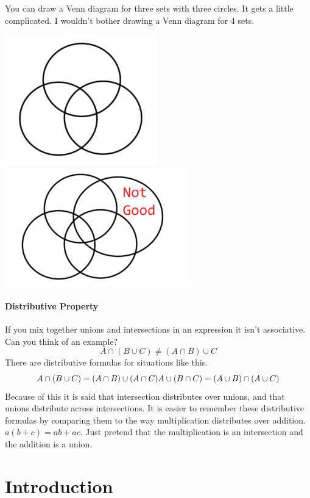 \documentclass[]{book}
\begin{document}
You can draw a Venn diagram for three sets with three circles. It gets a
little complicated. I wouldn't bother drawing a Venn diagram for 4 sets.

\includegraphics{Pictures/01-Sets/Venn3.PNG}
\includegraphics{Pictures/01-Sets/Venn4.PNG}

\subsubsection{Distributive Property}\label{distributive-property}

If you mix together unions and intersections in an expression it isn't
associative. Can you think of an example?
\[A \cap (B \cup C) \not= (A \cap B) \cup C\] There are distributive
formulas for situations like this.
\[ A \cap (B \cup C) = (A \cap B) \cup (A \cap C) \\
 A \cup (B \cap C) = (A \cup B) \cap (A \cup C)\] Because of this it is
said that intersection distributes over unions, and that unions
distribute across intersections. It is easier to remember these
distributive formulas by comparing them to the way multiplication
distributes over addition. \(a(b+c)=ab+ac\). Just pretend that the
multiplication is an intersection and the addition is a union.

\chapter{Introduction}\label{intro}
\end{document}
